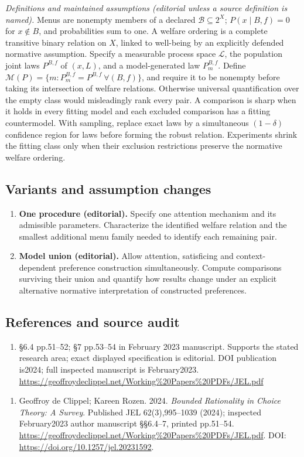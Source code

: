 \documentclass[11pt,a4paper]{article}
\begin{document}
\emph{Definitions and maintained assumptions (editorial unless a source definition is named).} Menus are nonempty members of a declared \(\mathcal B\subseteq2^X\); \(P(x\mid B,f)=0\) for \(x\notin B\), and probabilities sum to one. A welfare ordering is a complete transitive binary relation on \(X\), linked to well-being by an explicitly defended normative assumption. Specify a measurable process space \(\mathcal L\), the population joint laws \(P^{B,f}\) of \((x,L)\), and a model-generated law \(P_m^{B,f}\). Define \(\mathcal M(P)=\{m:P_m^{B,f}=P^{B,f}\ \forall(B,f)\}\), and require it to be nonempty before taking its intersection of welfare relations. Otherwise universal quantification over the empty class would misleadingly rank every pair. A comparison is sharp when it holds in every fitting model and each excluded comparison has a fitting countermodel. With sampling, replace exact laws by a simultaneous \((1-\delta)\) confidence region for laws before forming the robust relation. Experiments shrink the fitting class only when their exclusion restrictions preserve the normative welfare ordering.
\subsection*{Variants and assumption changes}
\begin{enumerate}
\item \textbf{One procedure (editorial).} Specify one attention mechanism and its admissible parameters. Characterize the identified welfare relation and the smallest additional menu family needed to identify each remaining pair.
\item \textbf{Model union (editorial).} Allow attention, satisficing and context-dependent preference construction simultaneously. Compute comparisons surviving their union and quantify how results change under an explicit alternative normative interpretation of constructed preferences.
\end{enumerate}
\subsection*{References and source audit}
\begin{enumerate}
\item §6.4 pp.51–52; §7 pp.53–54 in February 2023 manuscript. Supports the stated research area; exact displayed specification is editorial. DOI publication is2024; full inspected manuscript is February2023. \url{https://geoffroydeclippel.net/Working%20Papers%20PDFs/JEL.pdf}
\end{enumerate}
\begin{enumerate}\raggedright
\item\hypertarget{definitions:source:30007554:1}{} Geoffroy de Clippel; Kareen Rozen. 2024. \emph{Bounded Rationality in Choice Theory: A Survey}. Published JEL 62(3),995–1039 (2024); inspected February2023 author manuscript §§6.4–7, printed pp.51–54.
\url{https://geoffroydeclippel.net/Working%20Papers%20PDFs/JEL.pdf}.
DOI: \url{https://doi.org/10.1257/jel.20231592}.
\end{enumerate}
\end{document}
